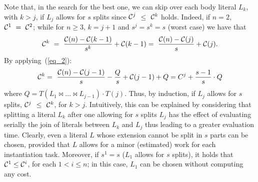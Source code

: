 \documentclass[preprint]{tlp}
\begin{document}
Note that, in the search for the best one, we can skip over each body literal $L_k$, with $k>j$, if $L_j$ allows for $s$ splits since ${\cal C}^j$ $\leq$  ${\cal C}^k$ holds.
Indeed, if $n = 2$, ${\cal C}^1 \ = \ {\cal C}^2$; while for $n \geq 3$,  $k = j+1$ and $s^j = s^k = s$ (worst case) we have that
$${\cal C}^k \ = \ \frac{{\cal C}(n)-{\cal C}(k-1)}{s^k} +{\cal C}(k-1) = \ \frac{{\cal C}(n)-{\cal C}(j)}{s} +{\cal C}(j).$$
By applying~(\ref{eq_2}):
$$ {\cal C}^k = \ \frac{{\cal C}(n)-{\cal C}(j-1)}{s}-\frac{Q}{s} +{\cal C}(j-1) + Q = C^j+ \frac{s-1}{s} \cdot Q$$ where $Q = T(L_1 \Join \dots \Join L_{j-1}) \cdot T(j)$.
Thus, by induction, if $L_j$ allows for $s$ splits, ${\cal C}^j$ $\leq$  ${\cal C}^k$, for $k>j$.
Intuitively, this can be explained by considering that splitting a literal $L_k$ after one allowing for $s$ splits $L_j$
has the effect of evaluating serially the join of literals between $L_k$ and $L_j$ thus leading to a greater evaluation time.
Clearly, even a literal $L$ whose extension cannot be split in $s$ parts can be chosen, provided that $L$ allows for a minor (estimated) work for each instantiation task.
Moreover, if $s^1 = s$ ($L_1$ allows for $s$ splits), it holds that ${\cal C}^1 \leq  {\cal C}^i$, for each $1< i\leq n$;
in this case, $L_1$ can be chosen without computing any cost.
\end{document}
